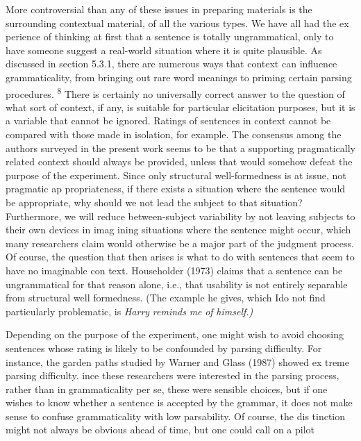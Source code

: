 \begin{styleStandard}
More controversial than any of these issues in preparing materials is the surrounding contextual material, of all the various types. We have all had the ex\- perience of thinking at first that a sentence is totally ungrammatical, only to have someone suggest a real-world situation where it is quite plausible. As discussed in section 5.3.1, there are numerous ways that context can influence grammaticality, from bringing out rare word meanings to priming certain parsing procedures. \textsuperscript{8}\textsuperscript{ }There is certainly no universally correct answer to the question of what sort of context, if any, is suitable for particular elicitation purposes, but it is a variable that cannot be ignored. Ratings of sentences in context cannot be compared with those made in isolation, for example. The consensus among the authors surveyed in the present work seems to be that a supporting pragmatically related context should always be provided, unless that would somehow defeat the purpose of the experiment. Since only structural well-formedness is at issue, not pragmatic ap\- propriateness, if there exists a situation where the sentence would be appropriate, why should we not lead the subject to that situation? Furthermore, we will reduce between-subject variability by not leaving subjects to their own devices in imag\- ining situations where the sentence might occur, which many researchers claim would otherwise be a major part of the judgment process. Of course, the question that then arises is what to do with sentences that seem to have no imaginable con\- text. Householder (1973) claims that a sentence can be ungrammatical for that reason alone, i.e., that usability is not entirely separable from structural well\- formedness. (The example he gives, which Ido not find particularly problematic, is \textit{Harry}\textit{ }\textit{reminds}\textit{ }\textit{me}\textit{ }\textit{of}\textit{ }\textit{himself.)}
\end{styleStandard}


\begin{styleStandard}
Depending on the purpose of the experiment, one might wish to avoid choosing sentences whose rating is likely to be confounded by parsing difficulty. For instance, the garden paths studied by Warner and Glass (1987) showed ex\- treme parsing difficulty. ince these researchers were interested in the parsing process, rather than in grammaticality per se, these were sensible choices, but if one wishes to know whether a sentence is accepted by the grammar, it does not make sense to confuse grammaticality with low parsability. Of course, the dis\- tinction might not always be obvious ahead of time, but one could call on a pilot
\end{styleStandard}


